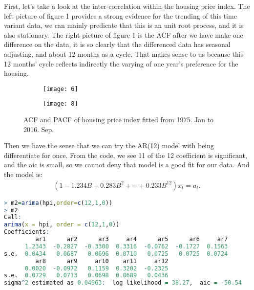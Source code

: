 \documentclass[12pt,letterpaper]{article}
\begin{document}
First, let's take a look at the inter-correlation within the housing price index. 
The left picture of figure 1 provides a strong evidence for the trending of this time variant data, we can mainly predicate that this is an unit root process, and it is also stationary. 
The right picture of figure 1 is the ACF after we have make one difference on the data, it is so clearly that the differenced data has seasonal adjusting, and about 12 months as a cycle.
That makes sense to us because this 12 months' cycle reflects indirectly the varying of one year's preference for the housing. 

\begin{figure*}[h!]
\begin{subfigure}[b]{0.4\textwidth}
\begin{center}
 \texttt{[image: 6]}
 \vspace{-0.4cm}
\end{center}
\end{subfigure}
\qquad 
\qquad
\begin{subfigure}[b]{0.4\textwidth}
\begin{center}
 \texttt{[image: 8]}
 \vspace{-0.4cm}
\end{center}
\end{subfigure}
 \vspace{-0.4cm}
 \caption{ ACF and PACF of housing price index fitted from 1975. Jan to 2016. Sep.}
      \label{fig:time}
\vspace{-.25cm}
\end{figure*}

Then we have the sense that we can try the AR(12) model with being differentiate for once.
From the code, we see 11 of the 12 coefficient is significant, and the aic is small, so we cannot deny that model is a good fit for our data.
And the model is:
 \begin{equation}
\begin{aligned}
(1-1.234B+0.283B^2+ \cdots + 0.233B^{12})x_t=a_t.
\end{aligned}
\end{equation}

{\footnotesize
\begin{lstlisting}[language=R]
> m2=arima(hpi,order=c(12,1,0))  
> m2
Call:
arima(x = hpi, order = c(12,1,0))
Coefficients:
         ar1      ar2      ar3     ar4      ar5      ar6     ar7     
      1.2343  -0.2827  -0.3300  0.3316  -0.0762  -0.1727  0.1563  
s.e.  0.0434   0.0687   0.0696  0.0710   0.0725   0.0725  0.0724  
         ar8      ar9     ar10    ar11     ar12
      0.0020  -0.0972   0.1159  0.3202  -0.2325
s.e.  0.0729   0.0713   0.0698  0.0689   0.0436
sigma^2 estimated as 0.04963:  log likelihood = 38.27,  aic = -50.54
\end{lstlisting}
}
\end{document}

